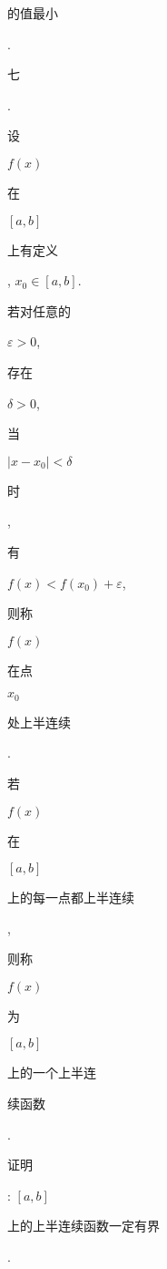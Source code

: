 \documentclass[10pt]{article}
\begin{document}
\begin{CJK}{UTF8}{mj}的值最小\end{CJK}. \begin{CJK}{UTF8}{mj}七\end{CJK}. \begin{CJK}{UTF8}{mj}设\end{CJK} $f(x)$ \begin{CJK}{UTF8}{mj}在\end{CJK} $[a, b]$ \begin{CJK}{UTF8}{mj}上有定义\end{CJK}, $x_{0} \in[a, b]$. \begin{CJK}{UTF8}{mj}若对任意的\end{CJK} $\varepsilon>0$, \begin{CJK}{UTF8}{mj}存在\end{CJK} $\delta>0$, \begin{CJK}{UTF8}{mj}当\end{CJK} $\left|x-x_{0}\right|<\delta$ \begin{CJK}{UTF8}{mj}时\end{CJK}, \begin{CJK}{UTF8}{mj}有\end{CJK} $f(x)<f\left(x_{0}\right)+\varepsilon$, \begin{CJK}{UTF8}{mj}则称\end{CJK} $f(x)$ \begin{CJK}{UTF8}{mj}在点\end{CJK} $x_{0}$ \begin{CJK}{UTF8}{mj}处上半连续\end{CJK}. \begin{CJK}{UTF8}{mj}若\end{CJK} $f(x)$ \begin{CJK}{UTF8}{mj}在\end{CJK} $[a, b]$ \begin{CJK}{UTF8}{mj}上的每一点都上半连续\end{CJK}, \begin{CJK}{UTF8}{mj}则称\end{CJK} $f(x)$ \begin{CJK}{UTF8}{mj}为\end{CJK} $[a, b]$ \begin{CJK}{UTF8}{mj}上的一个上半连\end{CJK} \begin{CJK}{UTF8}{mj}续函数\end{CJK}. \begin{CJK}{UTF8}{mj}证明\end{CJK}: $[a, b]$ \begin{CJK}{UTF8}{mj}上的上半连续函数一定有界\end{CJK}.
\end{document}
